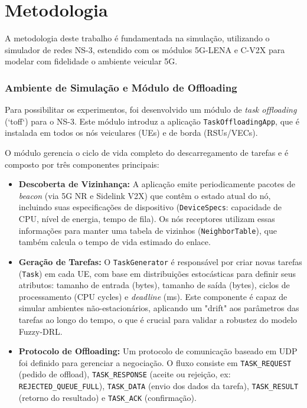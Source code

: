 \chapter{Metodologia}
\label{chap:metodologia}

A metodologia deste trabalho é fundamentada na simulação, utilizando o simulador de redes NS-3, estendido com os módulos 5G-LENA e C-V2X para modelar com fidelidade o ambiente veicular 5G.

\subsection{Ambiente de Simulação e Módulo de Offloading}
Para possibilitar os experimentos, foi desenvolvido um módulo de \textit{task offloading} (`toff`) para o NS-3. Este módulo introduz a aplicação \texttt{TaskOffloadingApp}, que é instalada em todos os nós veiculares (UEs) e de borda (RSUs/VECs).

O módulo gerencia o ciclo de vida completo do descarregamento de tarefas e é composto por três componentes principais:
\begin{itemize}
    \item \textbf{Descoberta de Vizinhança:} A aplicação emite periodicamente pacotes de \textit{beacon} (via 5G NR e Sidelink V2X) que contêm o estado atual do nó, incluindo suas especificações de dispositivo (\texttt{DeviceSpecs}: capacidade de CPU, nível de energia, tempo de fila). Os nós receptores utilizam essas informações para manter uma tabela de vizinhos (\texttt{NeighborTable}), que também calcula o tempo de vida estimado do enlace.
    \item \textbf{Geração de Tarefas:} O \texttt{TaskGenerator} é responsável por criar novas tarefas (\texttt{Task}) em cada UE, com base em distribuições estocásticas para definir seus atributos: tamanho de entrada (bytes), tamanho de saída (bytes), ciclos de processamento (CPU cycles) e \textit{deadline} (ms). Este componente é capaz de simular ambientes não-estacionários, aplicando um "drift" aos parâmetros das tarefas ao longo do tempo, o que é crucial para validar a robustez do modelo Fuzzy-DRL.
    \item \textbf{Protocolo de Offloading:} Um protocolo de comunicação baseado em UDP foi definido para gerenciar a negociação. O fluxo consiste em \texttt{TASK\_REQUEST} (pedido de offload), \texttt{TASK\_RESPONSE} (aceite ou rejeição, ex: \texttt{REJECTED\_QUEUE\_FULL}), \texttt{TASK\_DATA} (envio dos dados da tarefa), \texttt{TASK\_RESULT} (retorno do resultado) e \texttt{TASK\_ACK} (confirmação).
\end{itemize}

